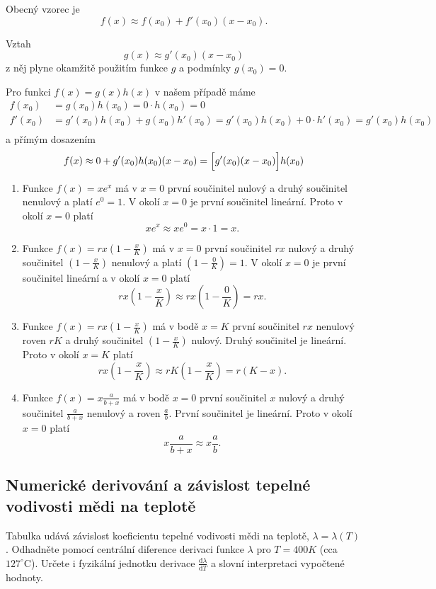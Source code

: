 \reseni

Obecný vzorec je
$$f(x)\approx f(x_0)+f'(x_0)(x-x_0).$$

Vztah $$g(x)\approx g'(x_0)(x-x_0)$$ z něj plyne okamžitě použitím funkce $g$ a podmínky $g(x_0)=0$.

Pro funkci $f(x)=g(x)h(x)$ v našem případě máme
$$
\begin{aligned}
f(x_0)&=g(x_0)h(x_0)=0\cdot  h(x_0)=0\\
f'(x_0)&=g'(x_0)h(x_0)+g(x_0)h'(x_0)=g'(x_0)h(x_0)+0\cdot h'(x_0)=g'(x_0)h(x_0)\\
\end{aligned}
$$
a přímým dosazením
$$f(x)\approx 0+g'(x_0)h(x_0)(x-x_0)=\Bigl[g'(x_0)(x-x_0)\Bigr]h(x_0)$$
\begin{enumerate}
\item Funkce $f(x)=xe^x$ má v $x=0$ první součinitel nulový a druhý součinitel nenulový a platí $e^0=1$. V okolí $x=0$ je první součinitel
  lineární.  Proto v okolí
  $x=0$ platí
  $$xe^x\approx xe^0=x\cdot 1=x.$$
\item Funkce $f(x)=rx\left(1-\frac xK\right)$ má v $x=0$ první
součinitel $rx$ nulový a  
druhý součinitel $\left(1-\frac xK\right)$ nenulový a platí
$\left(1-\frac 0K\right)=1$. V okolí $x=0$ je první součinitel lineární a v okolí $x=0$ platí
  $$rx\left(1-\frac xK\right)\approx rx\left(1-\frac 0K\right)=rx.$$
\item Funkce $f(x)=rx\left(1-\frac xK\right)$ má v bodě $x=K$ první součinitel $rx$ nenulový roven $rK$ a
   druhý součinitel $\left(1-\frac xK\right)$ nulový. Druhý součinitel je lineární. Proto v okolí
  $x=K$ platí
  $$rx\left(1-\frac xK\right)\approx rK\left(1-\frac xK\right)=r(K-x).$$
\item Funkce $f(x)=x\frac {a}{b+x}$ má v bodě $x=0$ první součinitel $x$ nulový  a
   druhý součinitel $\frac {a}{b+x}$ nenulový a roven $\frac ab$. První součinitel je lineární. Proto v okolí
  $x=0$ platí
  $$x\frac a{b+x}\approx x\frac ab.$$
\end{enumerate}

\konec

\stranka


\subsection{Numerické derivování a závislost tepelné vodivosti mědi na teplotě}


Tabulka udává závislost koeficientu tepelné vodivosti mědi na teplotě, $\lambda=\lambda(T)$. Odhadněte pomocí centrální diference derivaci funkce $\lambda$ pro $T=400K$ (cca $127^\circ \mathrm C$). Určete i fyzikální jednotku derivace $\frac{\mathrm d\lambda}{\mathrm dT}$ a slovní interpretaci vypočtené hodnoty.

